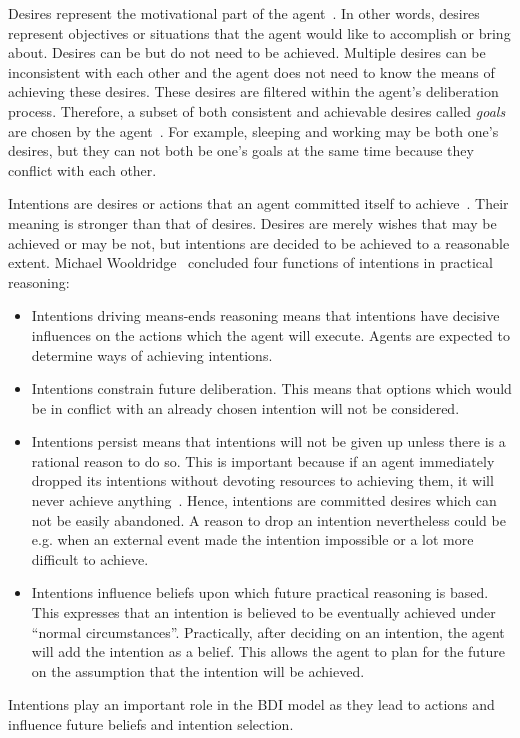 Desires represent the motivational part of the agent~\cite{Rao_BDITheory_1995}.
In other words, desires represent objectives or situations that the agent would like to accomplish or bring about.
Desires can be but do not need to be achieved.
Multiple desires can be inconsistent with each other and the agent does not need to know the means of achieving these desires.
These desires are filtered within the agent's deliberation process.
Therefore, a subset of both consistent and achievable desires called \emph{goals} are chosen by the agent~\cite{Gerhard_MultiSystem_1999}.
For example, sleeping and working may be both one's desires, but they can not both be one's goals at the same time because they conflict with each other.

Intentions are desires or actions that an agent committed itself to achieve~\cite{Alejandro_LearnBDI_2004}.
Their meaning is stronger than that of desires.
Desires are merely wishes that may be achieved or may be not, but intentions are decided to be achieved to a reasonable extent.
Michael Wooldridge~\cite{Gerhard_MultiSystem_1999} concluded four functions of intentions in practical reasoning:
\begin{itemize}
  \item Intentions driving means-ends reasoning means that intentions have decisive influences on the actions which the agent will execute.
    Agents are expected to determine ways of achieving intentions.
  \item Intentions constrain future deliberation.
    This means that options which would be in conflict with an already chosen intention will not be considered.
  \item Intentions persist means that intentions will not be given up unless there is a rational reason to do so.
    This is important because if an agent immediately dropped its intentions without devoting resources to achieving them, it will never achieve anything~\cite{Gerhard_MultiSystem_1999}.
    Hence, intentions are committed desires which can not be easily abandoned.
    A reason to drop an intention nevertheless could be e.g. when an external event made the intention impossible or a lot more difficult to achieve.
  \item Intentions influence beliefs upon which future practical reasoning is based.
    This expresses that an intention is believed to be eventually achieved under \enquote{normal circumstances}.
    Practically, after deciding on an intention, the agent will add the intention as a belief.
    This allows the agent to plan for the future on the assumption that the intention will be achieved.
\end{itemize}
Intentions play an important role in the BDI model as they lead to actions and influence future beliefs and intention selection.

